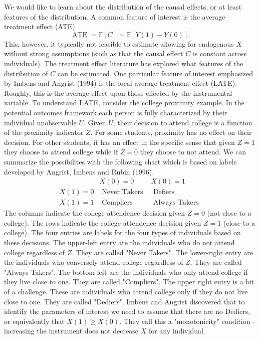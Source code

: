 \documentclass[10pt]{article}
\begin{document}
We would like to learn about the distribution of the causal effects, or at least features of the distribution. A common feature of interest is the average treatment effect (ATE)
$$
\operatorname{ATE}=\mathbb{E}[C]=\mathbb{E}[Y(1)-Y(0)] .
$$
This, however, it typically not feasible to estimate allowing for endogenous $X$ without strong assumptions (such as that the causal effect $C$ is constant across individuals). The treatment effect literature has explored what features of the distribution of $C$ can be estimated. One particular feature of interest emphasized by Imbens and Angrist (1994) is the local average treatment effect (LATE). Roughly, this is the average effect upon those effected by the instrumental variable. To understand LATE, consider the college proximity example. In the potential outcomes framework each person is fully characterized by their individual unobservable $U$. Given $U$, their decision to attend college is a function of the proximity indicator $Z$. For some students, proximity has no effect on their decision. For other students, it has an effect in the specific sense that given $Z=1$ they choose to attend college while if $Z=0$ they choose to not attend. We can summarize the possibilites with the following chart which is based on labels developed by Angrist, Imbens and Rubin (1996).
$$
\begin{array}{ccc} 
& X(0)=0 & X(0)=1 \\
X(1)=0 & \text { Never Takers } & \text { Defiers } \\
X(1)=1 & \text { Compliers } & \text { Always Takers }
\end{array}
$$
The columns indicate the college attendence decision given $Z=0$ (not close to a college). The rows indicate the college attendence decision given $Z=1$ (close to a college). The four entries are labels for the four types of individuals based on these decisions. The upper-left entry are the individuals who do not attend college regardless of $Z$. They are called "Never Takers". The lower-right entry are the individuals who conversely attend college regardless of $Z$. They are called "Always Takers". The bottom left are the individuals who only attend college if they live close to one. They are called "Compliers". The upper right entry is a bit of a challenge. These are individuals who attend college only if they do not live close to one. They are called "Dediers". Imbens and Angrist discovered that to identify the parameters of interest we need to assume that there are no Dediers, or equivalently that $X(1) \geq X(0)$. They call this a "monotonicity" condition - increasing the instrument does not decrease $X$ for any individual.
\end{document}
